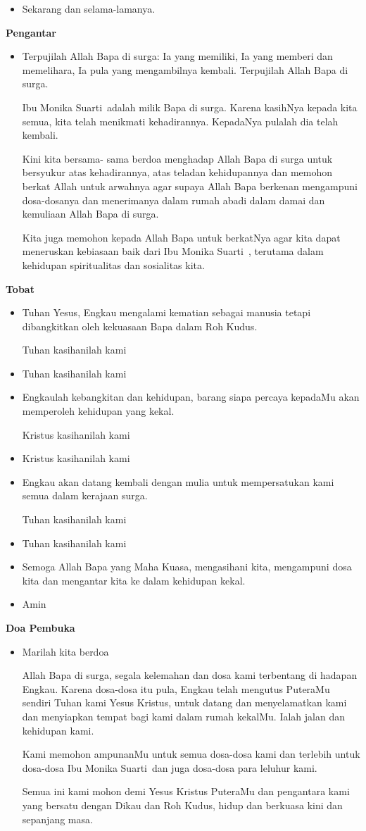 \documentclass[a5paper,headsepline,titlepage,11pt,nnormalheadings,DIVcalc]{scrbook}
\makeatletter
\newcommand{\subjudul}[1]{%
  {\parindent \z@ 
    \interlinepenalty\@M \bfseries #1\par\nobreak \vskip 10\p@ }}
\newcommand{\BU}[1]{\begin{itemize} \item[U:] #1 \end{itemize}}
\newcommand{\BI}[1]{\begin{itemize} \item[I:] #1 \end{itemize}}
\newcommand{\namaalm}{Ibu Monika Suarti~}
\makeatother
\begin{document}
\BU{Sekarang dan selama-lamanya.}

 

\subjudul{Pengantar}

\BI{Terpujilah Allah Bapa di surga: Ia yang memiliki, Ia yang 
memberi dan memelihara, Ia pula yang mengambilnya 
kembali. Terpujilah Allah Bapa di surga.

\namaalm adalah milik Bapa di surga. Karena kasihNya 
kepada kita semua, kita telah menikmati kehadirannya.
KepadaNya pulalah dia telah 
kembali.

Kini kita bersama-
sama berdoa menghadap Allah Bapa di surga untuk 
bersyukur atas kehadirannya, atas teladan kehidupannya 
dan memohon berkat Allah untuk arwahnya 
agar supaya Allah Bapa berkenan mengampuni dosa-dosanya 
dan menerimanya dalam rumah abadi dalam 
damai dan kemuliaan Allah Bapa di surga. 

Kita juga memohon kepada Allah Bapa untuk berkatNya 
agar kita dapat meneruskan kebiasaan baik dari \namaalm , 
terutama dalam kehidupan spiritualitas dan 
sosialitas kita.}

 

\subjudul{Tobat}

\BI{Tuhan Yesus, Engkau mengalami kematian sebagai manusia tetapi dibangkitkan oleh kekuasaan Bapa dalam Roh Kudus.

Tuhan kasihanilah kami}

\BU{Tuhan kasihanilah kami}

\BI{Engkaulah kebangkitan dan kehidupan, barang siapa percaya kepadaMu akan memperoleh kehidupan yang kekal.

Kristus kasihanilah kami}

\BU{Kristus kasihanilah kami}

\BI{Engkau akan datang kembali dengan mulia untuk mempersatukan kami semua dalam kerajaan surga.

Tuhan kasihanilah kami}

\BU{Tuhan kasihanilah kami}

\BI{Semoga Allah Bapa yang Maha Kuasa, mengasihani kita, 
mengampuni dosa kita dan mengantar kita ke dalam 
kehidupan kekal.}

\BU{Amin}

 

\subjudul{Doa Pembuka}

\BI{Marilah kita berdoa 

Allah Bapa di surga, segala kelemahan dan dosa kami 
terbentang di hadapan Engkau. Karena dosa-dosa itu 
pula, Engkau telah mengutus PuteraMu sendiri Tuhan 
kami Yesus Kristus, untuk datang dan menyelamatkan 
kami dan menyiapkan tempat bagi kami dalam rumah 
kekalMu. Ialah jalan dan kehidupan kami. 

Kami memohon ampunanMu untuk semua dosa-dosa kami 
dan terlebih untuk dosa-dosa \namaalm dan juga dosa-dosa para leluhur kami. 

Semua ini kami mohon demi Yesus Kristus PuteraMu dan 
pengantara kami yang bersatu dengan Dikau dan Roh 
Kudus, hidup dan berkuasa kini dan sepanjang masa.}
\end{document}
